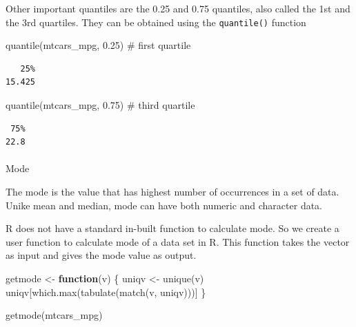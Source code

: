 \documentclass[
  letterpaper,
  DIV=11,
  numbers=noendperiod]{scrartcl}
\makeatletter
\let\oldparagraph\paragraph
\renewcommand{\paragraph}{
    \@ifstar
      \xxxParagraphStar
      \xxxParagraphNoStar
  }
\newcommand{\xxxParagraphStar}[1]{\oldparagraph*{#1}\mbox{}}
\newcommand{\xxxParagraphNoStar}[1]{\oldparagraph{#1}\mbox{}}
\newenvironment{Shaded}{\begin{snugshade}}{\end{snugshade}}
\newcommand{\CommentTok}[1]{\textcolor[rgb]{0.37,0.37,0.37}{#1}}
\newcommand{\ControlFlowTok}[1]{\textcolor[rgb]{0.00,0.23,0.31}{\textbf{#1}}}
\newcommand{\FloatTok}[1]{\textcolor[rgb]{0.68,0.00,0.00}{#1}}
\newcommand{\FunctionTok}[1]{\textcolor[rgb]{0.28,0.35,0.67}{#1}}
\newcommand{\NormalTok}[1]{\textcolor[rgb]{0.00,0.23,0.31}{#1}}
\newcommand{\OtherTok}[1]{\textcolor[rgb]{0.00,0.23,0.31}{#1}}
\makeatother
\begin{document}
Other important quantiles are the 0.25 and 0.75 quantiles, also called
the 1st and the 3rd quartiles. They can be obtained using the
\texttt{quantile()} function

\begin{Shaded}
\begin{Highlighting}[]
\FunctionTok{quantile}\NormalTok{(mtcars\_mpg, }\FloatTok{0.25}\NormalTok{) }\CommentTok{\# first quartile}
\end{Highlighting}
\end{Shaded}

\begin{verbatim}
   25% 
15.425 
\end{verbatim}

\begin{Shaded}
\begin{Highlighting}[]
\FunctionTok{quantile}\NormalTok{(mtcars\_mpg, }\FloatTok{0.75}\NormalTok{) }\CommentTok{\# third quartile}
\end{Highlighting}
\end{Shaded}

\begin{verbatim}
 75% 
22.8 
\end{verbatim}

\paragraph{Mode}\label{mode}

The mode is the value that has highest number of occurrences in a set of
data. Unike mean and median, mode can have both numeric and character
data.

R does not have a standard in-built function to calculate mode. So we
create a user function to calculate mode of a data set in R. This
function takes the vector as input and gives the mode value as output.

\begin{Shaded}
\begin{Highlighting}[]
\NormalTok{getmode }\OtherTok{\textless{}{-}} \ControlFlowTok{function}\NormalTok{(v) \{}
\NormalTok{   uniqv }\OtherTok{\textless{}{-}} \FunctionTok{unique}\NormalTok{(v)}
\NormalTok{   uniqv[}\FunctionTok{which.max}\NormalTok{(}\FunctionTok{tabulate}\NormalTok{(}\FunctionTok{match}\NormalTok{(v, uniqv)))]}
\NormalTok{\}}

\FunctionTok{getmode}\NormalTok{(mtcars\_mpg)}
\end{Highlighting}
\end{Shaded}
\end{document}
